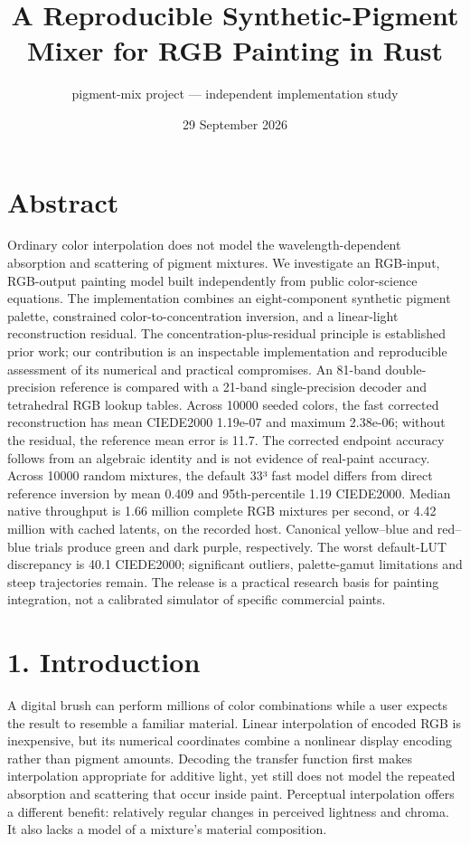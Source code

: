 \documentclass[
  10pt,
  twocolumn]{article}
\title{A Reproducible Synthetic-Pigment Mixer for RGB Painting in Rust}
\author{pigment-mix project --- independent implementation study}
\date{29 September 2026}
\begin{document}
\maketitle

\hypertarget{abstract}{%
\section{Abstract}\label{abstract}}

Ordinary color interpolation does not model the wavelength-dependent
absorption and scattering of pigment mixtures. We investigate an
RGB-input, RGB-output painting model built independently from public
color-science equations. The implementation combines an eight-component
synthetic pigment palette, constrained color-to-concentration inversion,
and a linear-light reconstruction residual. The
concentration-plus-residual principle is established prior work; our
contribution is an inspectable implementation and reproducible
assessment of its numerical and practical compromises. An 81-band
double-precision reference is compared with a 21-band single-precision
decoder and tetrahedral RGB lookup tables. Across 10000 seeded colors,
the fast corrected reconstruction has mean CIEDE2000 1.19e-07 and
maximum 2.38e-06; without the residual, the reference mean error is
11.7. The corrected endpoint accuracy follows from an algebraic identity
and is not evidence of real-paint accuracy. Across 10000 random
mixtures, the default 33³ fast model differs from direct reference
inversion by mean 0.409 and 95th-percentile 1.19 CIEDE2000. Median
native throughput is 1.66 million complete RGB mixtures per second, or
4.42 million with cached latents, on the recorded host. Canonical
yellow--blue and red--blue trials produce green and dark purple,
respectively. The worst default-LUT discrepancy is 40.1 CIEDE2000;
significant outliers, palette-gamut limitations and steep trajectories
remain. The release is a practical research basis for painting
integration, not a calibrated simulator of specific commercial paints.

\hypertarget{introduction}{%
\section{1. Introduction}\label{introduction}}

A digital brush can perform millions of color combinations while a user
expects the result to resemble a familiar material. Linear interpolation
of encoded RGB is inexpensive, but its numerical coordinates combine a
nonlinear display encoding rather than pigment amounts. Decoding the
transfer function first makes interpolation appropriate for additive
light, yet still does not model the repeated absorption and scattering
that occur inside paint. Perceptual interpolation offers a different
benefit: relatively regular changes in perceived lightness and chroma.
It also lacks a model of a mixture's material composition.
\end{document}
